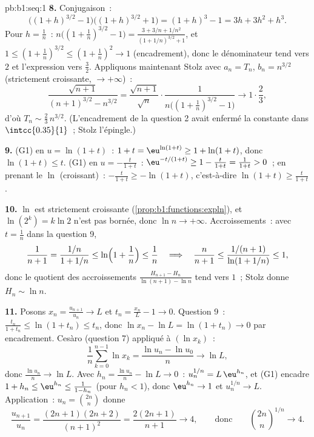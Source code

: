 \begin{solution}{pb:b1:seq:1}
\textbf{8.} Conjugaison~:
\[
\bigl((1+h)^{3/2} - 1\bigr)\bigl((1+h)^{3/2} + 1\bigr)
= (1+h)^3 - 1 = 3h + 3h^2 + h^3 .
\]
Pour $h = \frac1n$~: $n\bigl((1 + \frac1n)^{3/2} - 1\bigr) =
\frac{3 + 3/n + 1/n^2}{(1 + 1/n)^{3/2} + 1}$, et $1 \leq (1 +
\frac1n)^{3/2} \leq (1 + \frac1n)^2 \to 1$ (encadrement), donc le
dénominateur tend vers $2$ et l'expression vers $\frac32$. Appliquons
maintenant Stolz avec $a_n = T_n$, $b_n = n^{3/2}$ (strictement
croissante, $\to +\infty$)~:
\[
\frac{\sqrt{n+1}}{(n+1)^{3/2} - n^{3/2}}
= \frac{\sqrt{n+1}}{\sqrt n} \cdot
\frac{1}{n\bigl((1 + \frac1n)^{3/2} - 1\bigr)}
\longrightarrow 1 \cdot \frac{2}{3},
\]
d'où $T_n \sim \frac23\,n^{3/2}$. (L'encadrement de la question 2
avait enfermé la constante dans $\intcc{0.35}{1}$~; Stolz l'épingle.)

\textbf{9.} (G1) en $u = \ln(1+t)$~: $1 + t = \eu^{\ln(1+t)} \geq
1 + \ln(1+t)$, donc $\ln(1+t) \leq t$. (G1) en $u =
-\frac{t}{1+t}$~: $\eu^{-t/(1+t)} \geq 1 - \frac{t}{1+t} =
\frac{1}{1+t} > 0$~; en prenant le $\ln$ (croissant)~:
$-\frac{t}{1+t} \geq -\ln(1+t)$, c'est-à-dire $\ln(1+t) \geq
\frac{t}{1+t}$.

\textbf{10.} $\ln$ est strictement croissante
(\cref{prop:b1:functions:expln}), et $\ln(2^k) = k\ln 2$ n'est pas
bornée, donc $\ln n \to +\infty$. Accroissements~: avec $t =
\frac1n$ dans la question 9,
\[
\frac 1{n+1} = \frac{1/n}{1 + 1/n} \leq
\ln\Bigl(1 + \frac1n\Bigr) \leq \frac1n
\quad\Longrightarrow\quad
\frac{n}{n+1} \leq \frac{1/(n+1)}{\ln(1 + 1/n)} \leq 1 ,
\]
donc le quotient des accroissements $\frac{H_{n+1} - H_n}{\ln(n+1) -
\ln n}$ tend vers $1$~; Stolz donne $H_n \sim \ln n$.

\textbf{11.} Posons $x_n = \frac{u_{n+1}}{u_n} \to L$ et $t_n =
\frac{x_n}{L} - 1 \to 0$. Question 9~: $\frac{t_n}{1 + t_n} \leq
\ln(1 + t_n) \leq t_n$, donc $\ln x_n - \ln L = \ln(1 + t_n) \to
0$ par encadrement. Cesàro (question 7) appliqué à $(\ln x_k)$~:
\[
\frac1n \sum_{k=0}^{n-1} \ln x_k = \frac{\ln u_n - \ln u_0}{n}
\longrightarrow \ln L ,
\]
donc $\frac{\ln u_n}{n} \to \ln L$. Avec $h_n = \frac{\ln u_n}{n}
- \ln L \to 0$~: $u_n^{1/n} = L\,\eu^{h_n}$, et (G1) encadre
$1 + h_n \leq \eu^{h_n} \leq \frac{1}{1 - h_n}$ (pour $h_n < 1$),
donc $\eu^{h_n} \to 1$ et $u_n^{1/n} \to L$. Application~: $u_n =
\binom{2n}{n}$ donne
\[
\frac{u_{n+1}}{u_n} = \frac{(2n+1)(2n+2)}{(n+1)^2}
= \frac{2(2n+1)}{n+1} \longrightarrow 4 ,
\qquad\text{donc}\qquad
\binom{2n}{n}^{1/n} \to 4 .
\]


\end{solution}
